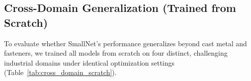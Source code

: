 \documentclass[conference]{IEEEtran}
\begin{document}
\begin{table}[t]
\centering
\caption{Spatial Reduction Mechanism Ablation (Fine-Pitch Domain)}
\label{tab:ablation_pooling}
\end{table}

\subsection{Cross-Domain Generalization (Trained from Scratch)}
To evaluate whether SmallNet's performance generalizes beyond cast metal and fasteners, we trained all models from scratch on four distinct, challenging industrial domains under identical optimization settings (Table~\ref{tab:cross_domain_scratch}).
\end{document}
